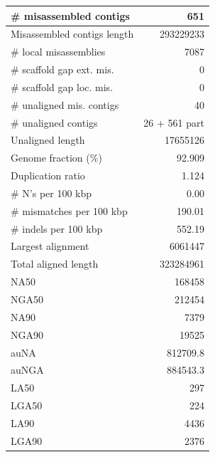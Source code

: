 \documentclass[12pt,a4paper]{article}
\begin{document}
\begin{table}[ht]
\begin{center}
\begin{tabular}{|l*{1}{|r}|}
\# misassembled contigs & 651 \\ \hline
Misassembled contigs length & 293229233 \\ \hline
\# local misassemblies & 7087 \\ \hline
\# scaffold gap ext. mis. & 0 \\ \hline
\# scaffold gap loc. mis. & 0 \\ \hline
\# unaligned mis. contigs & 40 \\ \hline
\# unaligned contigs & 26 + 561 part \\ \hline
Unaligned length & 17655126 \\ \hline
Genome fraction (\%) & 92.909 \\ \hline
Duplication ratio & 1.124 \\ \hline
\# N's per 100 kbp & 0.00 \\ \hline
\# mismatches per 100 kbp & 190.01 \\ \hline
\# indels per 100 kbp & 552.19 \\ \hline
Largest alignment & 6061447 \\ \hline
Total aligned length & 323284961 \\ \hline
NA50 & 168458 \\ \hline
NGA50 & 212454 \\ \hline
NA90 & 7379 \\ \hline
NGA90 & 19525 \\ \hline
auNA & 812709.8 \\ \hline
auNGA & 884543.3 \\ \hline
LA50 & 297 \\ \hline
LGA50 & 224 \\ \hline
LA90 & 4436 \\ \hline
LGA90 & 2376 \\ \hline
\end{tabular}
\end{center}
\end{table}
\end{document}
